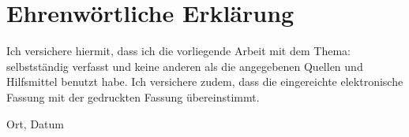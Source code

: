 
\clearpage
\chapter*{Ehrenwörtliche Erklärung}



Ich versichere hiermit, dass ich die vorliegende Arbeit
 mit dem Thema: \textit{\DerTitelDerArbeit} selbstständig verfasst und keine anderen als die angegebenen Quellen und
Hilfsmittel benutzt habe. Ich versichere zudem,
dass die eingereichte elektronische Fassung mit der gedruckten Fassung übereinstimmt.

\vspace{3cm}
Ort, Datum \hfill \DerAutorDerArbeit
